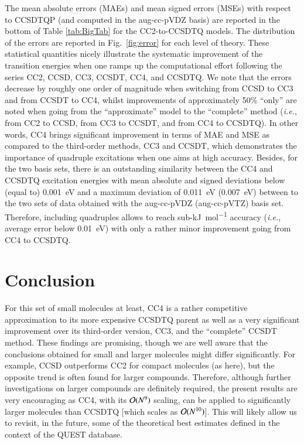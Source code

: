 \documentclass[aip,jcp,reprint,noshowkeys,superscriptaddress]{revtex4-1}
\newcommand{\ie}{\textit{i.e.}}
\begin{document}
The mean absolute errors (MAEs) and mean signed errors (MSEs) with respect to CCSDTQP (and computed in the aug-cc-pVDZ basis) are reported in the bottom of Table \ref{tab:BigTab} for the CC2-to-CCSDTQ models.
The distribution of the errors are reported in Fig.~\ref{fig:error} for each level of theory.
These statistical quantities nicely illustrate the systematic improvement of the transition energies when one ramps up the computational effort following the series CC2, CCSD, CC3, CCSDT, CC4, and CCSDTQ.
We note that the errors decrease by roughly one order of magnitude when switching from CCSD to CC3 and from CCSDT to CC4, whilst improvements of approximately 50\% ``only'' are noted when going from the ``approximate'' model to the ``complete'' method (\ie, from CC2 to CCSD, from CC3 to CCSDT, and from CC4 to CCSDTQ).
In other words, CC4 brings significant improvement in terms of MAE and MSE as compared to the third-order methods, CC3 and CCSDT, which demonstrates the importance of quadruple excitations when one aims at high accuracy.  
Besides, for the two basis sets, there is an outstanding similarity between the CC4 and CCSDTQ excitation energies with mean absolute and signed deviations below (equal to) \SI{0.001}{\eV} and a maximum deviation of \SI{0.011}{\eV} (\SI{0.007}{\eV}) between to the two sets of data obtained with 
the aug-cc-pVDZ (aug-cc-pVTZ) basis set. 
Therefore, including quadruples allows to reach sub-\si{\kJ\per\mol} accuracy (\ie, average error below \SI{0.01}{\eV}) with only a rather minor improvement going from CC4 to CCSDTQ.

\section{Conclusion}

For this set of small molecules at least, CC4 is a rather competitive approximation to its more expensive CCSDTQ parent as well as a very significant improvement over its third-order version, CC3, and the ``complete'' CCSDT method.
These findings are promising, though we are well aware that the conclusions obtained for small and larger molecules might differ significantly.
For example, CCSD outperforms CC2 for compact molecules (as here), but the opposite trend is often found for larger compounds.\cite{Loos_2018a,Loos_2020a,Veril_2021} 
Therefore, although further investigations on larger compounds are definitely required, the present results are very encouraging as CC4, with its $\order*{N^9}$ scaling, can be applied to significantly larger molecules than CCSDTQ [which scales as $\order*{N^{10}}$]. 
This will likely allow us to revisit, in the future, some of the theoretical best estimates defined in the context of the QUEST database.\cite{Loos_2020a,Veril_2021}
\end{document}
